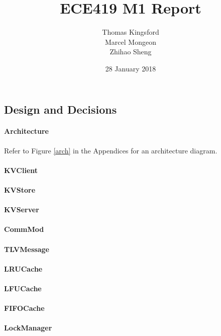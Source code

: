\documentclass[12pt]{article}
\title{ECE419 M1 Report}
\date{28 January 2018}
\author{Thomas Kingsford\\Marcel Mongeon\\Zhihao Sheng}
\begin{document}
\begin{multicols}{2}
\maketitle

\section{Design and Decisions}

\paragraph{Architecture} Refer to Figure \ref{arch} in the Appendices for an architecture diagram.

\paragraph{KVClient} 

\paragraph{KVStore}

\paragraph{KVServer}

\paragraph{CommMod}

\paragraph{TLVMessage}

\paragraph{LRUCache}

\paragraph{LFUCache}

\paragraph{FIFOCache}

\paragraph{LockManager}


\end{multicols}
\end{document}
